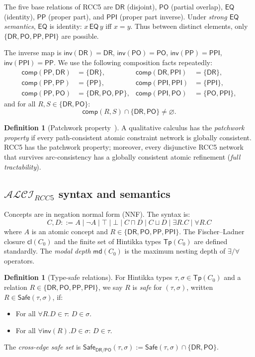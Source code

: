 \documentclass[a4paper,11pt]{article}
\theoremstyle{definition}
\newtheorem{definition}[theorem]{Definition}
\newcommand{\ALCIRCC}[1]{\ensuremath{\mathcal{ALCI}_{\mathit{RCC#1}}}}
\newcommand{\DR}{\ensuremath{\mathsf{DR}}}
\newcommand{\PO}{\ensuremath{\mathsf{PO}}}
\newcommand{\EQ}{\ensuremath{\mathsf{EQ}}}
\newcommand{\PP}{\ensuremath{\mathsf{PP}}}
\newcommand{\PPI}{\ensuremath{\mathsf{PPI}}}
\newcommand{\inv}{\ensuremath{\mathsf{inv}}}
\newcommand{\comp}{\ensuremath{\mathsf{comp}}}
\newcommand{\cl}{\ensuremath{\mathsf{cl}}}
\newcommand{\Tp}{\ensuremath{\mathsf{Tp}}}
\newcommand{\Safe}{\ensuremath{\mathsf{Safe}}}
\newcommand{\md}{\ensuremath{\mathsf{md}}}
\newcommand{\RCCrels}{\{\DR,\PO,\PP,\PPI\}}
\begin{document}
The five base relations of RCC5 are $\DR$ (disjoint), $\PO$ (partial
overlap), $\EQ$ (identity), $\PP$ (proper part), and $\PPI$ (proper
part inverse).  Under \emph{strong $\EQ$ semantics}, $\EQ$ is
identity: $x\,\EQ\,y$ iff $x = y$.  Thus between distinct elements,
only $\{\DR,\PO,\PP,\PPI\}$ are possible.

The inverse map is $\inv(\DR) = \DR$, $\inv(\PO) = \PO$,
$\inv(\PP) = \PPI$, $\inv(\PPI) = \PP$.
We use the following composition facts repeatedly:
\begin{align}
  \comp(\PP,\DR)  &= \{\DR\},
  &\comp(\DR,\PPI) &= \{\DR\},
  \label{eq:singleton-comp} \\
  \comp(\PP,\PP)  &= \{\PP\},
  &\comp(\PPI,\PPI) &= \{\PPI\},
  \label{eq:transitive-comp} \\
  \comp(\PP,\PO)  &= \{\DR,\PO,\PP\},
  &\comp(\PPI,\PO)  &= \{\PO,\PPI\},
  \label{eq:mixed-comp}
\end{align}
and for all $R, S \in \{\DR, \PO\}$:
\begin{equation}
  \comp(R, S) \cap \{\DR, \PO\} \neq \varnothing.
  \label{eq:drpo-support}
\end{equation}

\begin{definition}[Patchwork property~\cite{RenzNebel1999}]
A qualitative calculus has the \emph{patchwork property} if every
path-consistent atomic constraint network is globally consistent.
RCC5 has the patchwork property; moreover, every disjunctive RCC5
network that survives arc-consistency has a globally consistent atomic
refinement (\emph{full tractability}).
\end{definition}

\subsection{$\ALCIRCC{5}$ syntax and semantics}

Concepts are in negation normal form (NNF).  The syntax is:
\[
  C, D ::= A \mid \neg A \mid \top \mid \bot
    \mid C \sqcap D \mid C \sqcup D
    \mid \exists R.C \mid \forall R.C
\]
where $A$ is an atomic concept and $R \in \{\DR,\PO,\PP,\PPI\}$.
The Fischer--Ladner closure $\cl(C_0)$ and the finite set of
Hintikka types $\Tp(C_0)$ are defined standardly.
The \emph{modal depth} $\md(C_0)$ is the maximum nesting depth
of $\exists/\forall$ operators.

\begin{definition}[Type-safe relations]
\label{def:safe}
For Hintikka types $\tau, \sigma \in \Tp(C_0)$ and a relation
$R \in \RCCrels$, we say $R$ is \emph{safe} for $(\tau, \sigma)$,
written $R \in \Safe(\tau, \sigma)$, if:
\begin{itemize}[nosep]
  \item For all $\forall R.D \in \tau$: $D \in \sigma$.
  \item For all $\forall \inv(R).D \in \sigma$: $D \in \tau$.
\end{itemize}
The \emph{cross-edge safe set} is
$\Safe_{\DR/\PO}(\tau, \sigma) := \Safe(\tau, \sigma)
  \cap \{\DR, \PO\}$.
\end{definition}
\end{document}
